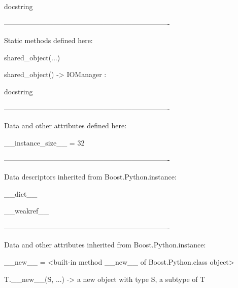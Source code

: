 \documentclass[letterpaper,10pt,english]{sphinxmanual}
\begin{document}
\begin{description}
\begin{description}
\begin{DUlineblock}{0em}
\begin{DUlineblock}{\DUlineblockindent}
\begin{DUlineblock}{\DUlineblockindent}
\item[] docstring
\item[] 
\end{DUlineblock}
\end{DUlineblock}
\item[] ----------------------------------------------------------------------
\item[] Static methods defined here:
\item[] 
\item[] shared\_object(...)
\item[]
\begin{DUlineblock}{\DUlineblockindent}
\item[] shared\_object() -\textgreater{} IOManager :
\item[]
\begin{DUlineblock}{\DUlineblockindent}
\item[] docstring
\item[] 
\end{DUlineblock}
\end{DUlineblock}
\item[] ----------------------------------------------------------------------
\item[] Data and other attributes defined here:
\item[] 
\item[] \_\_instance\_size\_\_ = 32
\item[] 
\item[] ----------------------------------------------------------------------
\item[] Data descriptors inherited from Boost.Python.instance:
\item[] 
\item[] \_\_dict\_\_
\item[] 
\item[] \_\_weakref\_\_
\item[] 
\item[] ----------------------------------------------------------------------
\item[] Data and other attributes inherited from Boost.Python.instance:
\item[] 
\item[] \_\_new\_\_ = \textless{}built-in method \_\_new\_\_ of Boost.Python.class object\textgreater{}
\item[]
\begin{DUlineblock}{\DUlineblockindent}
\item[] T.\_\_new\_\_(S, ...) -\textgreater{} a new object with type S, a subtype of T
\end{DUlineblock}
\end{DUlineblock}


\end{description}
\end{description}
\end{document}
